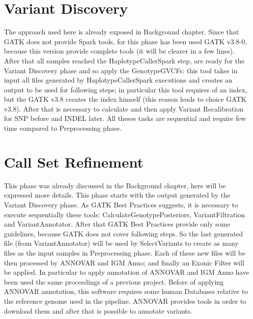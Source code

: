 \section{Variant Discovery}
The approach used here is already exposed in Background chapter. Since that GATK does not provide Spark tools, for this phase has been used GATK v3.8-0, because this version provide complete tools (it will be clearer in a few lines).
After that all samples reached the HaplotypeCallerSpark step, are ready for the Variant Discovery phase and so apply the GenotypeGVCFs: this tool takes in input all files generated by HaplotypeCallerSpark executions and creates an output to be used for following steps; in particular this tool requires of an index, but the GATK v3.8 creates the index himself (this reason leads to choice GATK v3.8).\newline
After that is necessary to calculate and then apply Variant Recalibration for SNP before and INDEL later. All theses tasks are sequential and require few time compared to Preprocessing phase.

\section{Call Set Refinement}
This phase was already discussed in the Background chapter, here will be expressed more details. This phase starts with the output generated by the Variant Discovery phase. As GATK Best Practices suggests, it is necessary to execute sequentially these tools: CalculateGenotypePosteriors, VariantFiltration and VariantAnnotator.\newline
After that GATK Best Practices provide only some guidelines, because GATK does not cover following steps. So the last generated file (from VariantAnnotator) will be used by SelectVariants to create as many files as the input samples in Preprocessing phase. Each of these new files will be then processed by ANNOVAR and IGM Anno; and finally an Exonic Filter will be applied.\newline
In particular to apply annotation of ANNOVAR and IGM Anno have been used the same proceedings of a previous project. Before of applying ANNOVAR annotation, this software requires some human Databases relative to the reference genome used in the pipeline. ANNOVAR provides tools in order to download them and after that is possible to annotate variants.

